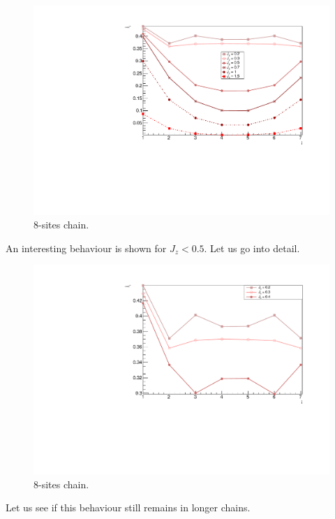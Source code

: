 \begin{figure}[H]
    \centering
    \includegraphics[scale=0.7]{Figures/8sites_spinCurrVSJz.pdf}
    \caption{8-sites chain.}
    \label{fig:my_label}
\end{figure}


An interesting behaviour is shown for $J_z < 0.5$. Let us go into detail.

\begin{figure}[H]
    \centering
    \includegraphics[scale=0.7]{Figures/8sites_spinCurrVsLOWJz.pdf}
    \caption{8-sites chain.}
    \label{fig:my_label}
\end{figure}

Let us see if this behaviour still remains in longer chains.


